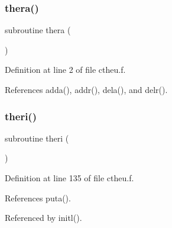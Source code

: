 \subsubsection{\texorpdfstring{thera()}{thera()}}
{\footnotesize\ttfamily subroutine thera (\begin{DoxyParamCaption}{ }\end{DoxyParamCaption})}



Definition at line 2 of file ctheu.\+f.



References adda(), addr(), dela(), and delr().

\mbox{\label{ctheu_8f_af6456aaf632220895a84571dc362ed83}} 
\subsubsection{\texorpdfstring{theri()}{theri()}}
{\footnotesize\ttfamily subroutine theri (\begin{DoxyParamCaption}{ }\end{DoxyParamCaption})}



Definition at line 135 of file ctheu.\+f.



References puta().



Referenced by initl().

\mbox{\label{ctheu_8f_a1e3f1a5bae834f4f8f58be58a30740f2}} 
